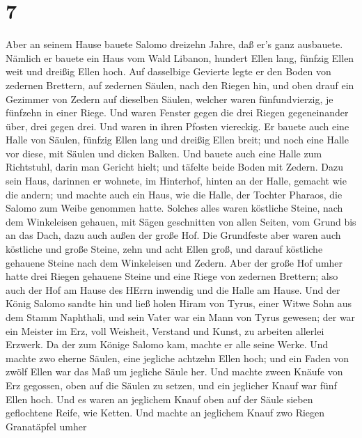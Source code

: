 \hypertarget{section-6}{%
\section{7}\label{section-6}}

 Aber an seinem Hause bauete Salomo dreizehn Jahre, daß er's
ganz ausbauete.  Nämlich er bauete ein Haus vom Wald
Libanon, hundert Ellen lang, fünfzig Ellen weit und dreißig Ellen hoch.
Auf dasselbige Gevierte legte er den Boden von zedernen Brettern, auf
zedernen Säulen, nach den Riegen hin,  und oben drauf ein
Gezimmer von Zedern auf dieselben Säulen, welcher waren fünfundvierzig,
je fünfzehn in einer Riege.  Und waren Fenster gegen die
drei Riegen gegeneinander über, drei gegen drei.  Und waren
in ihren Pfosten viereckig.  Er bauete auch eine Halle von
Säulen, fünfzig Ellen lang und dreißig Ellen breit; und noch eine Halle
vor diese, mit Säulen und dicken Balken.  Und bauete auch
eine Halle zum Richtstuhl, darin man Gericht hielt; und täfelte beide
Boden mit Zedern.  Dazu sein Haus, darinnen er wohnete, im
Hinterhof, hinten an der Halle, gemacht wie die andern; und machte auch
ein Haus, wie die Halle, der Tochter Pharaos, die Salomo zum Weibe
genommen hatte.  Solches alles waren köstliche Steine, nach
dem Winkeleisen gehauen, mit Sägen geschnitten von allen Seiten, vom
Grund bis an das Dach, dazu auch außen der große Hof.  Die
Grundfeste aber waren auch köstliche und große Steine, zehn und acht
Ellen groß,  und darauf köstliche gehauene Steine nach dem
Winkeleisen und Zedern.  Aber der große Hof umher hatte
drei Riegen gehauene Steine und eine Riege von zedernen Brettern; also
auch der Hof am Hause des HErrn inwendig und die Halle am Hause.
 Und der König Salomo sandte hin und ließ holen Hiram von
Tyrus,  einer Witwe Sohn aus dem Stamm Naphthali, und sein
Vater war ein Mann von Tyrus gewesen; der war ein Meister im Erz, voll
Weisheit, Verstand und Kunst, zu arbeiten allerlei Erzwerk. Da der zum
Könige Salomo kam, machte er alle seine Werke.  Und machte
zwo eherne Säulen, eine jegliche achtzehn Ellen hoch; und ein Faden von
zwölf Ellen war das Maß um jegliche Säule her.  Und machte
zween Knäufe von Erz gegossen, oben auf die Säulen zu setzen, und ein
jeglicher Knauf war fünf Ellen hoch.  Und es waren an
jeglichem Knauf oben auf der Säule sieben geflochtene Reife, wie Ketten.
 Und machte an jeglichem Knauf zwo Riegen Granatäpfel umher
